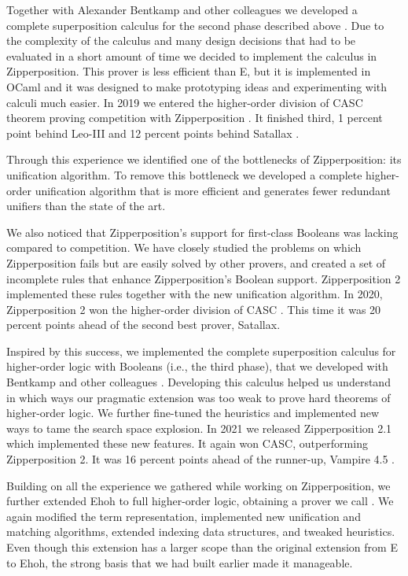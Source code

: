   Together with Alexander Bentkamp and other colleagues we developed
  a complete superposition calculus for the second phase described above
  \cite{bbtvw-21-sup-lam}. Due to the complexity of the calculus and many design
  decisions that had to be evaluated in a short amount of time we decided to
  implement the calculus in Zipperposition. This prover is less efficient than
  E, but it is implemented in OCaml and it was designed to make prototyping
  ideas and experimenting with calculi much easier. In 2019 we entered the
  higher-order division of CASC theorem proving competition with Zipperposition
  \cite{gs-19-casc27}. It finished third, 1 percent point behind Leo-III
  \cite{sb-21-leo3}  and 12 percent points behind  Satallax
  \cite{cb-12-satallax}.
  
  Through this experience we identified one of the bottlenecks of
  Zipperposition: its unification algorithm. To remove this bottleneck we
  developed a complete higher-order unification algorithm that is more
  efficient and generates fewer redundant unifiers than the state of the art. 
  
  We also noticed that Zipperposition's support for first-class Booleans
  was lacking compared to competition. We have closely studied the problems on
  which Zipperposition fails but are easily solved by other provers, and created
  a set of incomplete rules that enhance Zipperposition's Boolean support.
  Zipperposition 2 implemented these rules together with the new unification
  algorithm. In 2020, Zipperposition 2 won the higher-order division
  of CASC \cite{gs-21-cascj10}. This time it was 20 percent points ahead of the second best
  prover, Satallax.
  
  Inspired by this success, we implemented the complete superposition
  calculus for higher-order logic with Booleans (i.e., the third phase), that we developed with Bentkamp and other
  colleagues \cite{bbtv-21-full-ho-sup}. Developing this calculus helped us understand in which
  ways our pragmatic extension was too weak to prove hard theorems of
  higher-order logic. We further fine-tuned the heuristics and implemented new ways
  to tame the search space explosion. In 2021 we released Zipperposition 2.1
  which implemented these new features. It again won
  CASC, outperforming Zipperposition 2. It was 16 percent points ahead of the
  runner-up, Vampire 4.5 \cite{lkav-13-vampire}. 
  
  Building on all the experience we gathered while working on Zipperposition,
  we further extended Ehoh to full higher-order logic, obtaining a prover we call
  \newehoh{}. We again modified the term representation, implemented new unification and
  matching algorithms, extended indexing data structures, and tweaked
  heuristics. Even though this extension has a larger scope than the original
  extension from E to Ehoh, the strong basis that we had built earlier made it
  manageable.


